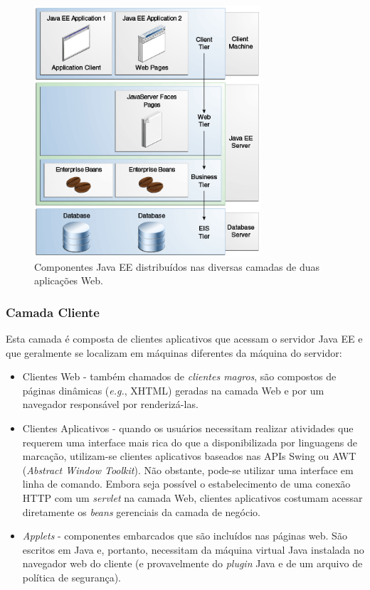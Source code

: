 \documentclass[
  10.5pt,				  %
	openright,			%
	twoside,			  %
  a5paper,
  chapter=TITLE,	%
	section=TITLE,	%
  hyphens,        %
	english,        %
	brazil          %
]{abntex2}
\begin{document}
\begin{figure}[!ht]
  \caption{\label{fig:multitiered_app}Componentes Java EE distribuídos nas diversas camadas de duas aplicações Web.}
  \begin{center}
    \includegraphics[width=0.75\textwidth]{multitiered_applications.png}
  \end{center}
\end{figure}

\subsubsection{Camada Cliente}

Esta camada é composta de clientes aplicativos que acessam o servidor Java EE e que geralmente se localizam em máquinas diferentes da máquina do servidor:

\begin{itemize}
  \item Clientes Web - também chamados de \emph{clientes magros}, são compostos de páginas dinâmicas (\emph{e.g.}, XHTML) geradas na camada Web e por um navegador responsável por renderizá-las.
  \item Clientes Aplicativos - quando os usuários necessitam realizar atividades que requerem uma interface mais rica do que a disponibilizada por linguagens de marcação, utilizam-se clientes aplicativos baseados nas APIs Swing ou AWT (\emph{Abstract Window Toolkit}). Não obstante, pode-se utilizar uma interface em linha de comando. Embora seja possível o estabelecimento de uma conexão HTTP com um \emph{servlet} na camada Web, clientes aplicativos costumam acessar diretamente os \emph{beans} gerenciais da camada de negócio.
  \item \emph{Applets} - componentes embarcados que são incluídos nas páginas web. São escritos em Java e, portanto, necessitam da máquina virtual Java instalada no navegador web do cliente (e provavelmente do \emph{plugin} Java e de um arquivo de política de segurança).
\end{itemize}
\end{document}
